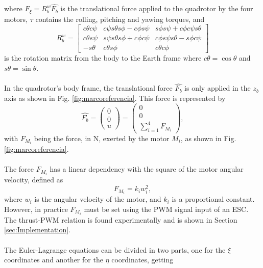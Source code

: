 where $F_{\xi}=R_{b}^{w}\hat{F_{b}}$ is the translational force applied to the quadrotor by the four motors, $\tau$ contains the rolling, pitching and yawing torques, and 
\begin{equation}
R_{b}^{w} = \begin{bmatrix}
c\theta c\psi & c\psi s\theta s\phi-c\phi s\psi & s\phi s\psi+c\phi c\psi s\theta\\
c\theta s\psi & s\psi s\theta s\phi+c\phi c\psi & c\phi s\psi s\theta - s\phi c\psi\\
-s\theta & c\theta s\phi & c\theta c\phi
\end{bmatrix}
\end{equation}
is the rotation matrix from the body to the Earth frame where $c\theta = \cos\theta$ and $s\theta = \sin\theta$.
\\\\
In the quadrotor's body frame, the translational force $\hat{F_{b}}$ is only applied in the $z_{b}$ axis as shown in Fig. \ref{fig:marcoreferencia}. This force is represented by
\begin{equation}
	\hat{F_{b}}=\begin{pmatrix}
	0\\
	0\\
	u
	\end{pmatrix} = \begin{pmatrix}
	0\\
	0\\
	\sum_{i=1}^{4}F_{M_i}
	\end{pmatrix}  ,
 \label{ec:fuerzas}
 \end{equation} 
with $ F_{M_i} $ being the force, in N, exerted by the motor $ M_{i}$, as shown in Fig. \ref{fig:marcoreferencia}.
\\\\
The force $ F_{M_i} $ has a linear dependency with the square of the motor angular velocity, defined as
\begin{equation}
	F_{M_i}=k_{i}w_{i}^{2},
	\label{ec:fi}
\end{equation}
where $ w_{i} $ is the angular velocity of the motor, and $ k_{i} $ is a proportional constant. However, in practice $F_{M_i}$ must be set using the PWM signal input of an ESC. The thrust-PWM relation is found experimentally and is shown in Section \ref{sec:Implementation}.
\\\\
The Euler-Lagrange equations can be divided in two parts, one for the $\xi$ coordinates and another for the $\eta$ coordinates, getting
